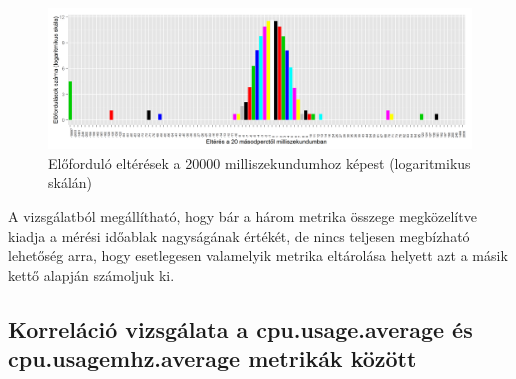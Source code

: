 \documentclass[a4paper,10pt,titlepage]{article}
\newcommand{\todo}[1]{
    \vfill
    \begingroup
        \setlength{\parindent}{0cm}
        \fcolorbox{todofrszin}{todobgszin}{
            \parbox{\textwidth}{
                \vskip10pt
                \leftskip10pt
                \rightskip10pt
            
                \emph{TODO: #1}
  
                \vskip10pt
            }
        }
    \endgroup
    \vfill
}
\begin{document}
\begin{figure}[h!]
\centering
\includegraphics[width=1.00\textwidth]{figures/cpu_run_wait_ready-diff-dist-log-20120826230140-20120924083120.png}
\caption{ Előforduló eltérések a 20000 milliszekundumhoz képest (logaritmikus skálán)\label{fig:cpu_run_wait_ready-diff-dist-log}}
\end{figure}

A vizsgálatból megállítható, hogy bár a három metrika összege megközelítve kiadja a mérési időablak nagyságának értékét, de nincs teljesen megbízható lehetőség arra, hogy esetlegesen valamelyik metrika eltárolása helyett azt a másik kettő alapján számoljuk ki.

%
%


\subsection{Korreláció vizsgálata a cpu.usage.average és cpu.usagemhz.average metrikák között}
\end{document}
